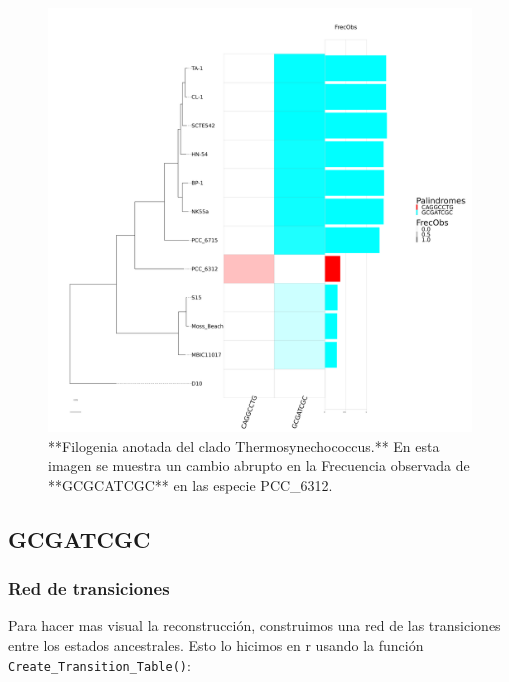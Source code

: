 \documentclass[
]{book}
\begin{document}
\begin{figure}

{\centering \includegraphics[width=1\linewidth]{Clados/Thermosynechococcus_clade/figures/thermosynechococcus_Octanuc_FrecObs_sel32_filogenia_HIG} 

}

\caption{**Filogenia anotada del clado Thermosynechococcus.** En esta imagen se muestra un cambio abrupto en la Frecuencia observada de **GCGCATCGC** en las especie PCC\_6312.}\label{fig:FIG12T}
\end{figure}

\hypertarget{gcgatcgc-4}{%
\subsection{GCGATCGC}\label{gcgatcgc-4}}

\hypertarget{red-de-transiciones-7}{%
\subsubsection{Red de transiciones}\label{red-de-transiciones-7}}

Para hacer mas visual la reconstrucción, construimos una red de las transiciones entre los estados ancestrales. Esto lo hicimos en r usando la función \texttt{Create\_Transition\_Table()}:
\end{document}
